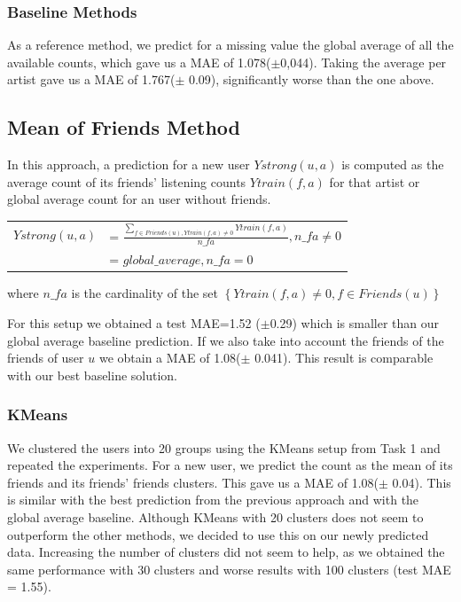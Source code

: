\subsubsection{Baseline Methods}
As a reference method, we predict for a missing value the global average of all the available counts, which gave us a MAE of 1.078($\pm$0,044). Taking the average per artist gave us a MAE of 1.767($\pm$  0.09), significantly worse than the one above.

\subsection{Mean of Friends Method}
In this approach, a prediction for a new user $Ystrong(u,a)$ is computed as the average count of its friends' listening counts $Ytrain(f,a)$ for that artist or global average count for an user without friends.

\begin{table}[h]
  \centering
  \begin{tabular}{ c  l }
  $Ystrong(u,a) $&= $\frac{\sum_{f\in Friends(u), Ytrain(f,a)\neq0}{Ytrain(f,a)}}{n\_fa}, n\_fa \neq 0$ \\ 
                          &= $global\_average, n\_fa = 0$ \\ 
  \end{tabular}
\end{table}
where $n\_fa$ is the cardinality of the set $\left\{ Ytrain(f,a)\neq0, f\in Friends(u)\right\}$

For this setup  we obtained a test MAE=1.52 ($\pm$0.29) which is smaller than our global average baseline prediction.
If we also take into account the friends of the friends of user $u$ we obtain  a MAE of 1.08($\pm$ 0.041). This result is comparable with our best baseline solution.

\subsubsection{KMeans}
We clustered the users into 20 groups using the KMeans setup from Task 1
and repeated the experiments. For a new user,  we predict the count as the mean of its friends and its friends' friends clusters. This gave us a MAE of 1.08($\pm$ 0.04). This is similar with the best prediction from the previous approach and with the  global average baseline. Although KMeans with 20 clusters does not seem to outperform the other methods, we decided to use this on our newly predicted data. Increasing the number of clusters did not seem to help, as we obtained the same performance with 30 clusters and worse results with 100 clusters (test MAE = 1.55). 
 

